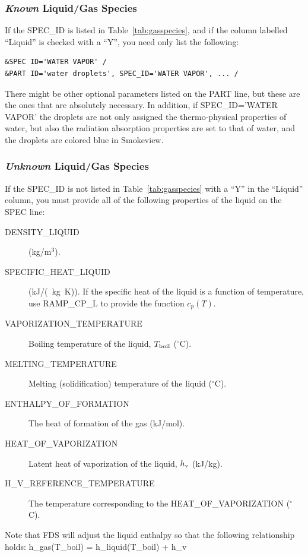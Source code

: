 \documentclass[11pt]{book}
\begin{document}
\subsubsection{{\it Known} Liquid/Gas Species}

If the {\ct SPEC\_ID} is listed in Table~\ref{tab:gasspecies}, and if the column labelled ``Liquid'' is checked with a ``Y'', you need only list the following:
\begin{lstlisting}
&SPEC ID='WATER VAPOR' /
&PART ID='water droplets', SPEC_ID='WATER VAPOR', ... /
\end{lstlisting}
There might be other optional parameters listed on the {\ct PART} line, but these are the ones that are absolutely necessary. In addition, if {\ct SPEC\_ID='WATER VAPOR'} the droplets are not only assigned the thermo-physical properties of water, but also the radiation absorption properties are set to that of water, and the droplets are colored blue in Smokeview.

\subsubsection{{\it Unknown} Liquid/Gas Species}

If the {\ct SPEC\_ID} is not listed in Table~\ref{tab:gasspecies} with a ``Y'' in the ``Liquid'' column, you must provide all of the following properties of the liquid on the {\ct SPEC} line:
\begin{description}
\item[{\ct DENSITY\_LIQUID}] (kg/m$^3$).
\item[{\ct SPECIFIC\_HEAT\_LIQUID}] (\si{kJ/(kg.K})). If the specific heat of the liquid is a function of temperature, use {\ct RAMP\_CP\_L} to provide the function $c_p(T)$.
\item[{\ct VAPORIZATION\_TEMPERATURE}] Boiling temperature of the liquid, $T_{\rm boil}$ ($^\circ$C).
\item[{\ct MELTING\_TEMPERATURE}] Melting (solidification) temperature of the liquid ($^\circ$C).
\item[{\ct ENTHALPY\_OF\_FORMATION}] The heat of formation of the gas (kJ/mol).
\item[{\ct HEAT\_OF\_VAPORIZATION}] Latent heat of vaporization of the liquid, $h_{\rm v}$ (kJ/kg).
\item[{\ct H\_V\_REFERENCE\_TEMPERATURE}] The temperature corresponding to the {\ct HEAT\_OF\_VAPORIZATION} ($^\circ$C).
\end{description}
Note that FDS will adjust the liquid enthalpy so that the following relationship holds:
\be
   h_{\rm gas}(T_{\rm boil}) = h_{\rm liquid}(T_{\rm boil}) + h_{\rm v}
\ee
\end{document}
